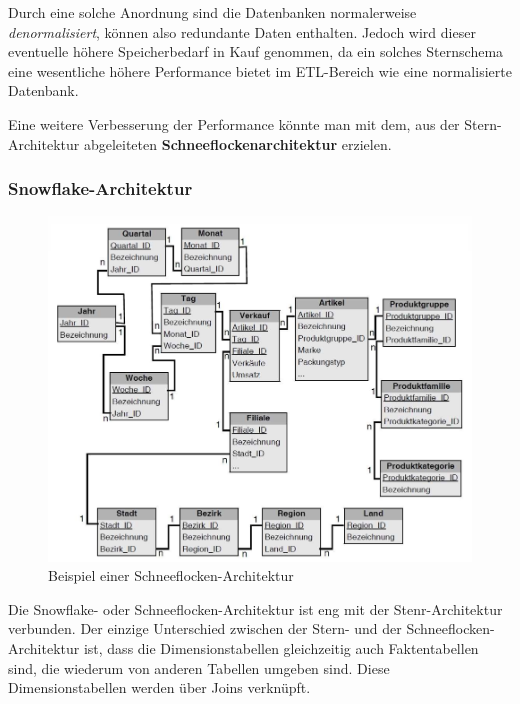 \documentclass[a4paper, 11pt]{article}
\begin{document}
Durch eine solche Anordnung sind die Datenbanken normalerweise \textit{denormalisiert}, können also redundante Daten enthalten. Jedoch wird dieser eventuelle höhere Speicherbedarf in Kauf genommen, da ein solches Sternschema eine wesentliche höhere Performance bietet im ETL-Bereich wie eine normalisierte Datenbank.

\vspace{10px}

\noindent Eine weitere Verbesserung der Performance könnte man mit dem, aus der Stern-Architektur abgeleiteten \textbf{Schneeflockenarchitektur} erzielen.

\newpage

\subsubsection{Snowflake-Architektur}
\begin{figure}
	\centering
	\includegraphics[keepaspectratio=true,height=18\baselineskip]{snowflake.PNG}
	\caption{Beispiel einer Schneeflocken-Architektur}
	\label{label}
\end{figure}

Die Snowflake- oder Schneeflocken-Architektur ist eng mit der Stenr-Architektur verbunden. Der einzige Unterschied zwischen der Stern- und der Schneeflocken-Architektur ist, dass die Dimensionstabellen gleichzeitig auch Faktentabellen sind, die wiederum von anderen Tabellen umgeben sind. Diese Dimensionstabellen werden über Joins verknüpft. 
\end{document}
